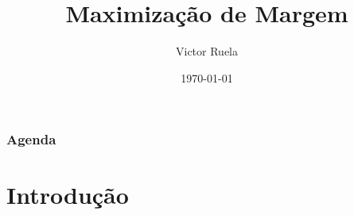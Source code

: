 \documentclass{beamer}
\title[Redes Neurais Artificiais 2020/2]{Maximização de Margem} %
\author{Victor Ruela} %
\institute[PPGEE - UFMG] %
{
Programa de Pós-Graduação em Engenharia Elétrica\\ Universidade Federal de Minas Gerais \\ %
\medskip
\textit{victorspruela@ufmg.br} %
}
\date{\today} %
\begin{document}
\begin{frame}
\titlepage %
\end{frame}

\begin{frame}
\frametitle{Agenda} %
\tableofcontents %
\end{frame}


\section{Introdução} %

\end{document}
